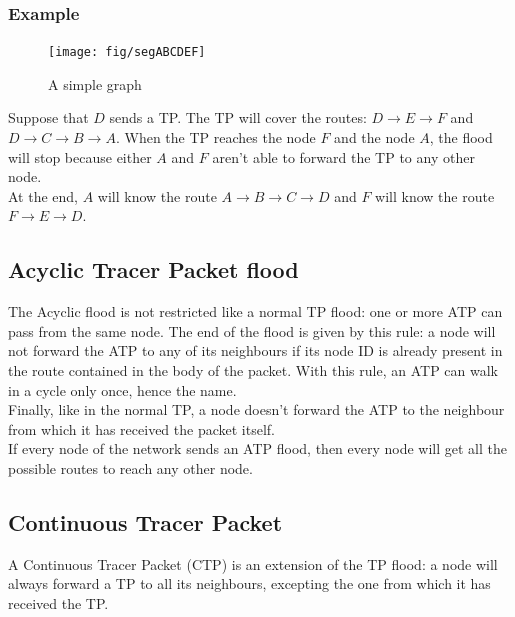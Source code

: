 \documentclass[a4paper]{article}
\begin{document}
\subsubsection*{Example}
\begin{figure}[h]
	\begin{center}
		\texttt{[image: fig/segABCDEF]}
	\end{center}
	\caption{A simple graph}
\end{figure}

Suppose that $D$ sends a TP. The TP will cover the routes:
$D \rightarrow E \rightarrow F$ and $D \rightarrow C \rightarrow B \rightarrow A$.
When the TP reaches the node $F$ and the node $A$, the flood will stop
because either $A$ and $F$ aren't able to forward the TP to any other node.\\

At the end, $A$ will know the route $A \rightarrow B \rightarrow C \rightarrow D$
and $F$ will know the route $F \rightarrow E \rightarrow D$.

\subsection{Acyclic Tracer Packet flood}
\label{sec:acyclic_TP_flood}

The Acyclic flood is not restricted like a normal TP flood: one or more ATP can
pass from the same node. The end of the flood is given by this rule: a node
will not forward the ATP to any of its neighbours if its node ID is already present
in the route contained in the body of the packet. With this rule, an ATP can
walk in a cycle only once, hence the name.\\

Finally, like in the normal TP, a node doesn't forward the ATP to the
neighbour from which it has received the packet itself.\\

If every node of the network sends an ATP flood, then every node will get
all the possible routes to reach any other node.

\subsection{Continuous Tracer Packet}
\label{sec:CTP}

A Continuous Tracer Packet (CTP) is an extension of the TP flood: a node will
always forward a TP to all its neighbours, excepting the one from which it has
received the TP.\\
\end{document}
